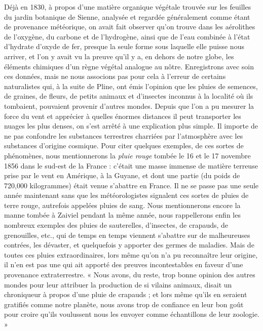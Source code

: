 \documentclass[a4paper, 11pt, oneside, landscape]{article}
\begin{document}
Déjà en 1830, à propos d'une matière organique végétale trouvée sur les feuilles du jardin botanique de Sienne, analysée et regardée généralement comme étant de provenance météorique, on avait fait observer qu'on trouve dans les aérolithes de l'oxygène, du carbone et de l'hydrogène, ainsi que de l'eau combinée à l'état d'hydrate d'oxyde de fer, presque la seule forme sous laquelle elle puisse nous arriver, et l'on y avait vu la preuve qu'il y a, en dehors de notre globe, les éléments chimiques d'un règne végétal analogue au nôtre. Enregistrons avec soin ces données, mais ne nous associons pas pour cela à l'erreur de certains naturalistes qui, à la suite de Pline, ont émis l'opinion que les pluies de semences, de graines, de fleurs, de petits animaux et d'insectes inconnus à la localité où ils tombaient, pouvaient provenir d'autres mondes. Depuis que l'on a pu mesurer la force du vent et apprécier à quelles énormes distances il peut transporter les nuages les plus denses, on s'est arrêté à une explication plus simple. Il importe de ne pas confondre les substances terrestres charriées par l'atmosphère avec les substances d'origine cosmique. Pour citer quelques exemples, de ces sortes de phénomènes, nous mentionnerons la \emph{pluie rouge} tombée le 16 et le 17 novembre 1856 dans le sud-est de la France : c'était une masse immense de matière terreuse prise par le vent en Amérique, à la Guyane, et dont une partie (du poids de 720,000 kilogrammes) était venue s'abattre en France. Il ne se passe pas une seule année maintenant sans que les météorologistes signalent ces sortes de pluies de terre rouge, autrefois appelées pluies de sang. Nous mentionnerons encore la manne tombée à Zaiviel pendant la même année, nous rappellerons enfin les nombreux exemples des pluies de sauterelles, d'insectes, de crapauds, de grenouilles, etc., qui de temps en temps viennent s'abattre sur de malheureuses contrées, les dévaster, et quelquefois y apporter des germes de maladies. Mais de toutes ces pluies extraordinaires, lors même qu'on n'a pu reconnaître leur origine, il n'en est pas une qui ait apporté des preuves incontestables en faveur d'une provenance extraterrestre. « Nous avons, du reste, trop bonne opinion des autres mondes pour leur attribuer la production de si vilains animaux, disait un chroniqueur à propos d'une pluie de crapauds ; et lors même qu'ils en seraient gratifiés comme notre planète, nous avons trop de confiance en leur bon goût pour croire qu'ils voulussent nous les envoyer comme échantillons de leur zoologie. »
\end{document}
